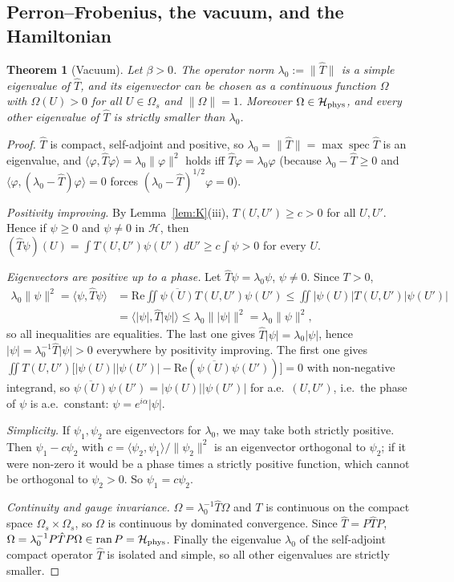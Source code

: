 \documentclass[11pt,a4paper]{article}
\newtheorem{theorem}{Theorem}[section]
\theoremstyle{definition}
\theoremstyle{remark}
\DeclareMathOperator{\spec}{spec}
\newcommand{\cH}{\mathcal{H}}
\newcommand{\hT}{\hat{T}}
\newcommand{\dU}{\,dU}
\newcommand{\ip}[2]{\langle #1,#2\rangle}
\newcommand{\norm}[1]{\lVert #1\rVert}
\begin{document}
\subsection{Perron--Frobenius, the vacuum, and the Hamiltonian}

\begin{theorem}[Vacuum]\label{thm:vacuum}
Let $\beta>0$. The operator norm $\lambda_0:=\norm{\hT}$ is a simple eigenvalue of $\hT$, and its eigenvector can be
chosen as a continuous function $\Omega$ with $\Omega(U)>0$ for all $U\in\Omega_s$ and $\norm\Omega=1$. Moreover
$\Omega\in\cH_{\rm phys}$, and every other eigenvalue of $\hT$ is strictly smaller than $\lambda_0$.
\end{theorem}

\begin{proof}
$\hT$ is compact, self-adjoint and positive, so $\lambda_0=\norm{\hT}=\max\spec\hT$ is an eigenvalue, and
$\ip\varphi{\hT\varphi}=\lambda_0\norm\varphi^2$ holds iff $\hT\varphi=\lambda_0\varphi$ (because $\lambda_0-\hT\ge0$
and $\ip\varphi{(\lambda_0-\hT)\varphi}=0$ forces $(\lambda_0-\hT)^{1/2}\varphi=0$).

\emph{Positivity improving.} By Lemma~\ref{lem:K}(iii), $T(U,U')\ge c>0$ for all $U,U'$. Hence if $\psi\ge0$ and $\psi\neq0$
in $\cH$, then $(\hT\psi)(U)=\int T(U,U')\psi(U')\dU'\ge c\int\psi>0$ for every $U$.

\emph{Eigenvectors are positive up to a phase.} Let $\hT\psi=\lambda_0\psi$, $\psi\neq0$. Since $T>0$,
\begin{align*}
\lambda_0\norm\psi^2=\ip\psi{\hT\psi}&=\mathrm{Re}\iint\overline{\psi(U)}T(U,U')\psi(U')
\le\iint|\psi(U)|T(U,U')|\psi(U')|\\
&=\ip{|\psi|}{\hT|\psi|}\le\lambda_0\norm{|\psi|}^2=\lambda_0\norm\psi^2 ,
\end{align*}
so all inequalities are equalities. The last one gives $\hT|\psi|=\lambda_0|\psi|$, hence $|\psi|=\lambda_0^{-1}\hT|\psi|>0$
everywhere by positivity improving. The first one gives $\iint T(U,U')\bigl[|\psi(U)||\psi(U')|-\mathrm{Re}(\overline{\psi(U)}\psi(U'))\bigr]=0$
with non-negative integrand, so $\overline{\psi(U)}\psi(U')=|\psi(U)||\psi(U')|$ for a.e.\ $(U,U')$, i.e.\ the phase of
$\psi$ is a.e.\ constant: $\psi=e^{i\alpha}|\psi|$.

\emph{Simplicity.} If $\psi_1,\psi_2$ are eigenvectors for $\lambda_0$, we may take both strictly positive. Then
$\psi_1-c\psi_2$ with $c=\ip{\psi_2}{\psi_1}/\norm{\psi_2}^2$ is an eigenvector orthogonal to $\psi_2$; if it were non-zero
it would be a phase times a strictly positive function, which cannot be orthogonal to $\psi_2>0$. So $\psi_1=c\psi_2$.

\emph{Continuity and gauge invariance.} $\Omega=\lambda_0^{-1}\hT\Omega$ and $T$ is continuous on the compact space
$\Omega_s\times\Omega_s$, so $\Omega$ is continuous by dominated convergence. Since $\hT=P\hT P$,
$\Omega=\lambda_0^{-1}P\hT P\Omega\in\mathrm{ran}\,P=\cH_{\rm phys}$. Finally the eigenvalue $\lambda_0$ of the
self-adjoint compact operator $\hT$ is isolated and simple, so all other eigenvalues are strictly smaller.
\end{proof}
\end{document}
